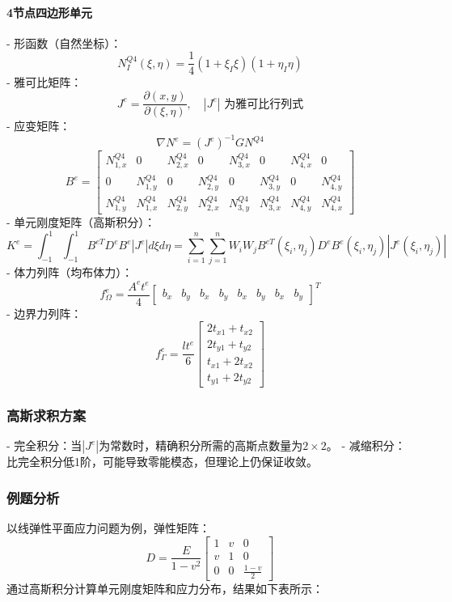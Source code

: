 \documentclass{article}
\begin{document}
\paragraph{4节点四边形单元}
- 形函数（自然坐标）：
  \[
  N_{I}^{Q 4}(\xi, \eta) = \frac{1}{4}\left(1 + \xi_{I} \xi\right)\left(1 + \eta_{I} \eta\right)
  \]
- 雅可比矩阵：
  \[
  J^{e} = \frac{\partial(x,y)}{\partial(\xi,\eta)}, \quad |J^{e}| \text{ 为雅可比行列式}
  \]
- 应变矩阵：
  \[
  \nabla N^{e} = (J^{e})^{-1} G N^{Q 4}
  \]
  \[
  B^{e} = \left[\begin{array}{ccccccccc}N_{1,x}^{Q 4} & 0 & N_{2,x}^{Q 4} & 0 & N_{3,x}^{Q 4} & 0 & N_{4,x}^{Q 4} & 0 \\ 0 & N_{1,y}^{Q 4} & 0 & N_{2,y}^{Q 4} & 0 & N_{3,y}^{Q 4} & 0 & N_{4,y}^{Q 4} \\ N_{1,y}^{Q 4} & N_{1,x}^{Q 4} & N_{2,y}^{Q 4} & N_{2,x}^{Q 4} & N_{3,y}^{Q 4} & N_{3,x}^{Q 4} & N_{4,y}^{Q 4} & N_{4,x}^{Q 4}\end{array}\right]
  \]
- 单元刚度矩阵（高斯积分）：
  \[
  K^{e} = \int_{-1}^{1} \int_{-1}^{1} B^{e T} D^{e} B^{e}|J^{e}| d\xi d\eta = \sum_{i=1}^{n} \sum_{j=1}^{n} W_{i} W_{j} B^{e T}(\xi_{i}, \eta_{j}) D^{e} B^{e}(\xi_{i}, \eta_{j})|J^{e}(\xi_{i}, \eta_{j})|
  \]
- 体力列阵（均布体力）：
  \[
  f_{\Omega}^{e} = \frac{A^{e} t^{e}}{4}\left[\begin{array}{lllllllll} b_{x} & b_{y} & b_{x} & b_{y} & b_{x} & b_{y} & b_{x} & b_{y} \end{array}\right]^{T}
  \]
- 边界力列阵：
  \[
  f_{\Gamma}^{e} = \frac{l t^{e}}{6}\left[\begin{array}{c} 2 t_{x 1} + t_{x 2} \\ 2 t_{y 1} + t_{y 2} \\ t_{x 1} + 2 t_{x 2} \\ t_{y 1} + 2 t_{y 2} \end{array}\right]
  \]

\subsubsection{高斯求积方案}
- 完全积分：当$|J^{e}|$为常数时，精确积分所需的高斯点数量为$2 \times 2$。
- 减缩积分：比完全积分低1阶，可能导致零能模态，但理论上仍保证收敛。

\subsubsection{例题分析}
以线弹性平面应力问题为例，弹性矩阵：
\[
D = \frac{E}{1-v^{2}}\left[\begin{array}{ccc} 1 & v & 0 \\ v & 1 & 0 \\ 0 & 0 & \frac{1-v}{2} \end{array}\right]
\]
通过高斯积分计算单元刚度矩阵和应力分布，结果如下表所示：
\end{document}
